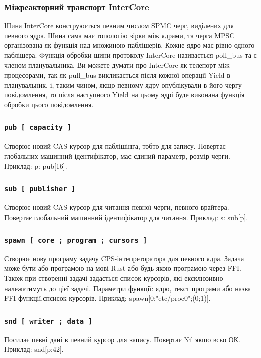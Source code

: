 \newpage
\subsubsection{Міжреакторний транспорт InterCore}
Шина InterCore конструюється певним числом SPMC черг, виділених для певного ядра.
Шина сама має топологію зірки між ядрами, та черга MPSC організована
як функція над множиною паблішерів. Кожне ядро має рівно одного паблішера.
Функція обробки шини протоколу InterCore називається poll\_bus та є членом планувальника.
Ви можете думати про InterCore як телепорт між процесорами, так як pull\_bus
викликається після кожної операції Yield в планувальник, і, таким чином,
якщо певному ядру опублікували в його чергу повідомлення, то після наступного Yield
на цьому ядрі буде виконана функція обробки цього повідомлення.

\subsubsection*{\lstinline{pub [ capacity ]}}
Створює новий CAS курсор для паблішінга, тобто для запису.
Повертає глобальних машинний ідентифікатор, має єдиний параметр, розмір черги.
Приклад: p: pub[16].

\subsubsection*{\lstinline{sub [ publisher ]}}
Створює новий CAS курсор для читання певної черги, певного врайтера.
Повертає глобальний машинний ідентифікатор для читання.
Приклад: s: sub[p].

\subsubsection*{\lstinline{spawn [ core ; program ; cursors ]}}
Створює нову програму задачу CPS-інтепреторатора для певного ядра.
Задача може бути або програмою на мові Rust або будь якою програмою через FFI.
Також при створенні задачі задається список курсорів,
які ексклюзивно належатимуть до цієї задачі.
Параметри функції: ядро, текст програми або назва FFI функції,спсисок курсорів.
Приклад: spawn[0;"etc/proc0";(0;1)].

\subsubsection*{\lstinline{snd [ writer ; data ]}}
Посилає певні дані в певний курсор для запису. Повертає Nil якшо всьо ОК.
Приклад: snd[p;42].

